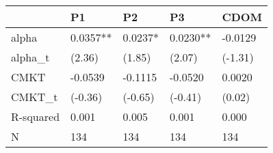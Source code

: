 \begin{tabular}{lllll}
\toprule
 & P1 & P2 & P3 & CDOM \\
\midrule
alpha & 0.0357** & 0.0237* & 0.0230** & -0.0129 \\
alpha_t & (2.36) & (1.85) & (2.07) & (-1.31) \\
CMKT & -0.0539 & -0.1115 & -0.0520 & 0.0020 \\
CMKT_t & (-0.36) & (-0.65) & (-0.41) & (0.02) \\
R-squared & 0.001 & 0.005 & 0.001 & 0.000 \\
N & 134 & 134 & 134 & 134 \\
\bottomrule
\end{tabular}
